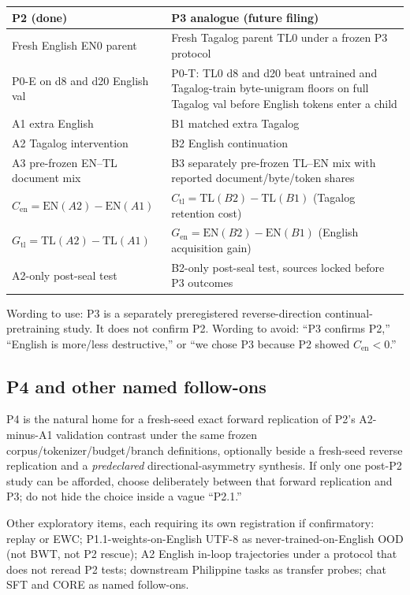 \documentclass[11pt,a4paper]{article}
\begin{document}
\begin{center}
\small
\begin{tabular}{p{}p{}}
\toprule
P2 (done) & P3 analogue (future filing) \\
\midrule
Fresh English EN0 parent & Fresh Tagalog parent TL0 under a frozen P3 protocol \\
P0-E on d8 and d20 English val & P0-T: TL0 d8 and d20 beat untrained and Tagalog-train byte-unigram floors on full Tagalog val before English tokens enter a child \\
A1 extra English & B1 matched extra Tagalog \\
A2 Tagalog intervention & B2 English continuation \\
A3 pre-frozen EN--TL document mix & B3 separately pre-frozen TL--EN mix with reported document/byte/token shares \\
\(C_{\mathrm{en}}=\mathrm{EN}(A2)-\mathrm{EN}(A1)\) & \(C_{\mathrm{tl}}=\mathrm{TL}(B2)-\mathrm{TL}(B1)\) (Tagalog retention cost) \\
\(G_{\mathrm{tl}}=\mathrm{TL}(A2)-\mathrm{TL}(A1)\) & \(G_{\mathrm{en}}=\mathrm{EN}(B2)-\mathrm{EN}(B1)\) (English acquisition gain) \\
A2-only post-seal test & B2-only post-seal test, sources locked before P3 outcomes \\
\bottomrule
\end{tabular}
\end{center}

Wording to use: P3 is a separately preregistered reverse-direction continual-pretraining study. It does not confirm P2. Wording to avoid: ``P3 confirms P2,'' ``English is more/less destructive,'' or ``we chose P3 because P2 showed \(C_{\mathrm{en}}<0\).''

\subsection{P4 and other named follow-ons}
P4 is the natural home for a fresh-seed exact forward replication of P2's A2-minus-A1 validation contrast under the same frozen corpus/tokenizer/budget/branch definitions, optionally beside a fresh-seed reverse replication and a \emph{predeclared} directional-asymmetry synthesis. If only one post-P2 study can be afforded, choose deliberately between that forward replication and P3; do not hide the choice inside a vague ``P2.1.''

Other exploratory items, each requiring its own registration if confirmatory: replay or EWC; P1.1-weights-on-English UTF-8 as never-trained-on-English OOD (not BWT, not P2 rescue); A2 English in-loop trajectories under a protocol that does not reread P2 tests; downstream Philippine tasks as transfer probes; chat SFT and CORE as named follow-ons.
\end{document}
